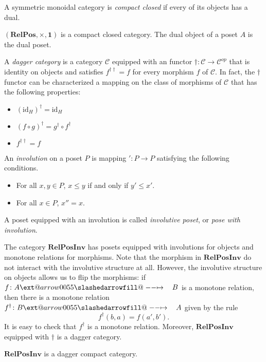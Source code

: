 \documentclass{beamer}
\makeatletter
\newcommand{\id}{\mathrm{id}}
\newcommand{\C}{\mathcal{C}}
\newcommand{\RelPos}{\mathbf{RelPos}}
\newcommand{\RelPosInv}{\mathbf{RelPosInv}}
\def\slashedarrowfill@#1#2#3#4#5{%
  $\m@th\thickmuskip0mu\medmuskip\thickmuskip\thinmuskip\thickmuskip
  \relax#5#1\mkern-7mu%
  \cleaders\hbox{$#5\mkern-2mu#2\mkern-2mu$}\hfill
  \mathclap{#3}\mathclap{#2}%
  \cleaders\hbox{$#5\mkern-2mu#2\mkern-2mu$}\hfill
  \mkern-7mu#4$%
}
\def\rightslashedarrowfill@{%
  \slashedarrowfill@\relbar\relbar\mapstochar\rightarrow}
\newcommand\xslashedrightarrow[2][]{%
  \ext@arrow 0055{\rightslashedarrowfill@}{#1}{#2}}
\newcommand{\sto}{\xslashedrightarrow{\hskip 1pc}}
\makeatother
\begin{document}
\begin{frame}
\begin{definition}
A symmetric monoidal category is {\em compact closed}
if every of its objects has a dual.
\end{definition}
\begin{theorem}
$(\RelPos,\times,\mathbf 1)$ is a compact closed category. The dual object of a poset $A$
is the dual poset.
\end{theorem}
\end{frame}
\begin{frame}
A {\em dagger category} is a category $\C$ 
equipped with an functor $\dag\colon\C\to\C^{op}$ that is identity
on objects and satisfies $f^{\dag\dag}=f$ for every morphism $f$ of $\C$. In
fact, the $\dag$ functor can be characterized a mapping on the class of morphisms
of $\C$ that has the following properties:
\begin{itemize}
\item $(\id_H)^\dag=\id_H$
\item $(f\circ g )^\dag=g^\dag\circ f^\dag$
\item $f^{\dag\dag}=f$
\end{itemize}
\end{frame}
\begin{frame}
An {\em involution} on a poset $P$ is mapping $'\colon P\to P$ satisfying the following
conditions.
\begin{itemize}
\item For all $x,y\in P$, $x≤y$ if and only if $y'≤x'$.
\item For all $x\in P$, $x''=x$.
\end{itemize}
A poset equipped with an involution is called {\em involutive poset}, or
{\em pose with involution}.
\end{frame}
\begin{frame}
The category $\RelPosInv$ has posets equipped with involutions for objects and
monotone relations for morphisms. Note that the morphism in $\RelPosInv$ do not
interact with the involutive structure at all. However, the involutive structure
on objects allows us to flip the morphisms: if $f\colon A\sto B$ is a monotone
relation, then there is a monotone relation $f^\dag\colon B\sto A$ given by the
rule
$$
f^\dag(b,a)=f(a',b').
$$ 
It is easy to check that $f^\dag$ is a monotone relation.
Moreover, $\RelPosInv$ equipped with $\dag$ is a dagger category.
\end{frame}
\begin{frame}
\begin{theorem}
$\RelPosInv$ is a dagger compact category.
\end{theorem}
\end{frame}
\end{document}
